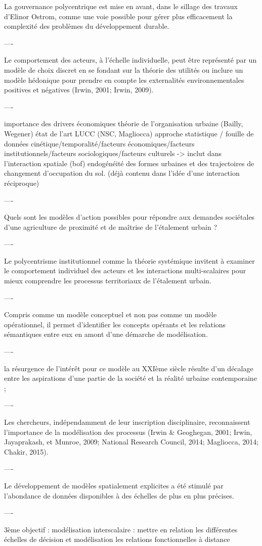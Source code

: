 La gouvernance polycentrique est mise en avant,
dans le sillage des travaux d'Elinor Ostrom,
comme une voie possible pour gérer plus efficacement la complexité
des problèmes du développement durable.

----

Le comportement des acteurs, à l'échelle individuelle,
peut être représenté par un modèle de choix discret
en se fondant sur la théorie des utilités ou inclure
un modèle hédonique pour prendre en compte les externalités
environnementales positives et négatives (Irwin, 2001; Irwin, 2009).

----

importance des drivers économiques
théorie de l'organisation urbaine (Bailly, Wegener)
état de l'art LUCC (NSC, Magliocca)
approche statistique / fouille de données
cinétique/temporalité/facteurs économiques/facteurs institutionnels/facteurs sociologiques/facteurs culturels
-> inclut dans l'interaction spatiale
(bof) endogénéité des formes urbaines et des trajectoires de changement d'occupation du sol.
      (déjà contenu dans l'idée d'une interaction réciproque)

----

Quels sont les modèles d'action possibles
	pour répondre aux demandes sociétales d'une agriculture
	de proximité et de maîtrise de l'étalement urbain ?

----

Le polycentrisme institutionnel comme la théorie systémique
invitent à examiner le comportement individuel des acteurs
et les interactions multi-scalaires pour mieux comprendre
les processus territoriaux de l'étalement urbain.

----

Compris comme un modèle conceptuel et non pas comme un modèle opérationnel,
	il permet d'identifier les concepts opérants et les relations sémantiques entre eux
	en amont d'une démarche de modélisation.

----

la résurgence de l'intérêt pour ce modèle au XXIème siècle résulte d'un décalage entre
les aspirations d'une partie de la société
et la réalité urbaine contemporaine ;

----

Les chercheurs, indépendamment de leur inscription disciplinaire,
reconnaissent l'importance de la modélisation des processus
(Irwin & Geoghegan, 2001;
 Irwin, Jayaprakash, et Munroe, 2009;
 National Research Council, 2014;
 Magliocca, 2014;
 Chakir, 2015).

----

Le développement de modèles spatialement explicites
a été stimulé par l'abondance de données disponibles
à des échelles de plus en plus précises.

----

3ème objectif : modélisation interscalaire : mettre en relation
les différentes échelles de décision et modélisation les relations fonctionnelles
à distance